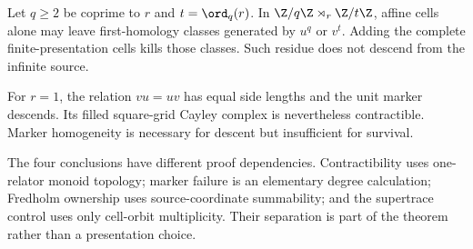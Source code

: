 \begin{corollary}
\label{cor:finite}
Let $q\ge2$ be coprime to $r$ and $t=\ord_q(r)$.  In
$\Z/q\Z\rtimes_r\Z/t\Z$, affine cells alone may leave first-homology classes
generated by $u^q$ or $v^t$.  Adding the complete finite-presentation cells
kills those classes.  Such residue does not descend from the infinite source.
\end{corollary}

\begin{corollary}
\label{cor:balanced}
For $r=1$, the relation $vu=uv$ has equal side lengths and the unit marker
descends.  Its filled square-grid Cayley complex is nevertheless contractible.
Marker homogeneity is necessary for descent but insufficient for survival.
\end{corollary}

The four conclusions have different proof dependencies.  Contractibility
uses one-relator monoid topology; marker failure is an elementary degree
calculation; Fredholm ownership uses source-coordinate summability; and the
supertrace control uses only cell-orbit multiplicity.  Their separation is
part of the theorem rather than a presentation choice.
